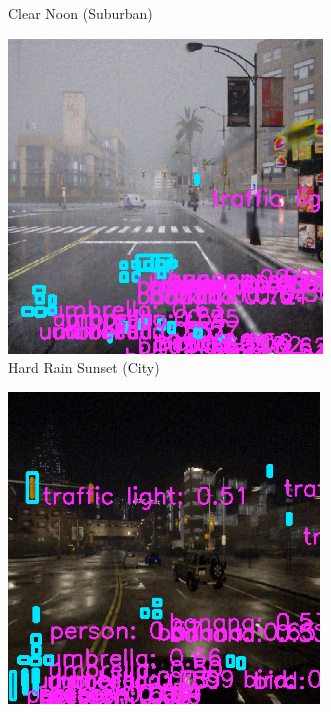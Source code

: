 \begin{figure}[tbp]
\begin{subfigure}[b]{0.22\textwidth}
        \caption{Clear Noon (Suburban)}
        \label{fig:clear_noon_suburban}
    \end{subfigure}
    \begin{subfigure}[b]{0.22\textwidth}
        \centering
        \includegraphics[width=\linewidth]{figures/chapter_detection/hardware/hard_rain_city.png}
        \caption{Hard Rain Sunset (City)}
        \label{fig:hard_rain} 
    \end{subfigure}
    \begin{subfigure}[b]{0.22\textwidth}
        \centering
        \includegraphics[width=\linewidth]{figures/chapter_detection/hardware/wet_cloudy_city.png}

\end{subfigure}
\end{figure}
